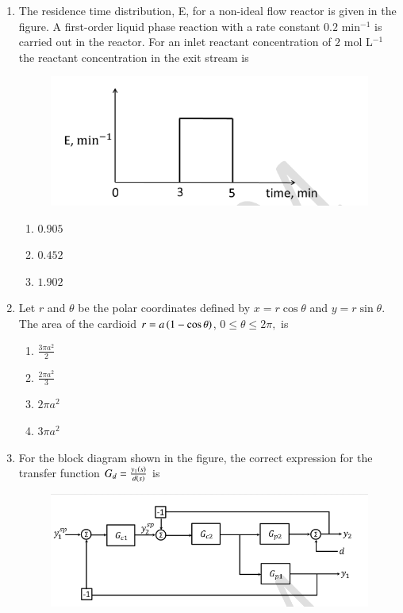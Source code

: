 \documentclass[journal,12pt,onecolumn]{IEEEtran}
\theoremstyle{remark}
\begin{document}
\begin{enumerate}
	\item The residence time distribution, E, for a non-ideal flow reactor is given in the figure. A first-order liquid phase reaction with a rate constant $0.2$ min$^{-1}$ is carried out in the reactor. For an inlet reactant concentration of $2$ mol L$^{-1}$ the reactant concentration  in the exit stream is
	\begin{figure}
		\includegraphics[width = 0.5\columnwidth]{q46}
		\caption*{}
		\label{fig:q46}
	\end{figure}
	
	\hfill{}
	\begin{enumerate}
		\item $0.905$
		\item $0.452$
		\item $1.902$
	\end{enumerate}
	
	\item Let $r$ and $\theta$ be the polar coordinates defined by $x=r \cos \theta$ and $y=r \sin \theta$. The area of the cardioid $r=a\left(1-\cos\theta\right)$, $0\le\theta\le2\pi,$ is
	
	\hfill{}
	\begin{enumerate}
		\item $\frac{3\pi a^2}{2}$
		\item $\frac{2\pi a^2}{3}$
		\item $2\pi a^2$
		\item $3\pi a^2$
	\end{enumerate}
	
	\item For the block diagram shown in the figure, the correct expression for the transfer function $G_d=\frac{y_1\left(s\right)}{d\left(s\right)}$ is
	\begin{figure}
		\includegraphics[width = 0.8\columnwidth]{q48}
		\caption*{}
		\label{fig:q48}
	\end{figure}
	

\end{enumerate}
\end{document}
